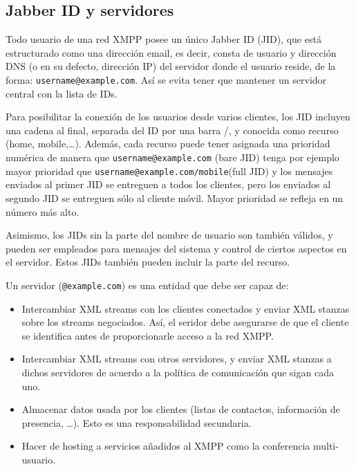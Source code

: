 \documentclass[a4paper, 11pt]{article} %
\begin{document}
  \subsection{Jabber ID y servidores}
    Todo usuario de una red XMPP posee un único Jabber ID (JID), que está estructurado como una dirección email, es decir, 
    consta de usuario y dirección DNS (o en su defecto, dirección IP) del servidor donde el usuario reside, de la forma:
    \texttt{username@example.com}. Así se evita tener que mantener un servidor central con la lista de IDs.
    
    Para posibilitar la conexión de los usuarios desde varios clientes, los JID incluyen una cadena al final, separada
    del ID por una barra /, y conocida como recurso (home, mobile,\ldots). Además, cada recurso puede
    tener asignada una prioridad numérica de manera que \texttt{username@example.com} (bare JID) tenga por ejemplo mayor prioridad que 
    \texttt{username@example.com/mobile}(full JID) y los mensajes enviados al primer JID se entreguen a todos los clientes,
    pero los enviados al segundo JID se entreguen sólo al cliente móvil. Mayor prioridad se refleja en un número más alto.
    
    Asimismo, los JIDs sin la parte del nombre de usuario son también válidos, y pueden ser empleados para mensajes del
    sistema y control de ciertos aspectos en el servidor. Estos JIDs también pueden incluir la parte del recurso.
    
    Un servidor (\texttt{@example.com}) es una entidad que debe ser capaz de:
    \begin{itemize}
     \item Intercambiar XML streams con los clientes conectados y enviar XML stanzas sobre los streams negociados. Así, el
     seridor debe asegurarse de que el cliente se identifica antes de proporcionarle acceso a la red XMPP.
     \item Intercambiar XML streams con otros servidores, y enviar XML stanzas a dichos servidores de acuerdo a la política
     de comunicación que sigan cada uno.
     \item Almacenar datos usada por los clientes (listas de contactos, información de presencia, \ldots). Esto es una
     responsabilidad secundaria.
     \item Hacer de hosting a servicios añadidos al XMPP como la conferencia multi-usuario.
    \end{itemize}
    
\end{document}
